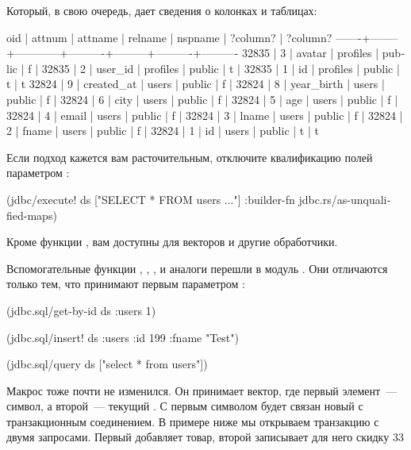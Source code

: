 Который, в свою очередь, дает сведения о колонках и таблицах:

\begin{english}
  \begin{text}
  oid  | attnum |  attname   | relname  | nspname | ?column? | ?column?
-------+--------+------------+----------+---------+----------+----------
 32835 |      3 | avatar     | profiles | public  | f        |
 32835 |      2 | user_id    | profiles | public  | t        |
 32835 |      1 | id         | profiles | public  | t        | t
 32824 |      9 | created_at | users    | public  | f        |
 32824 |      8 | year_birth | users    | public  | f        |
 32824 |      6 | city       | users    | public  | f        |
 32824 |      5 | age        | users    | public  | f        |
 32824 |      4 | email      | users    | public  | f        |
 32824 |      3 | lname      | users    | public  | f        |
 32824 |      2 | fname      | users    | public  | f        |
 32824 |      1 | id         | users    | public  | t        | t
  \end{text}
\end{english}

Если подход кажется вам расточительным, отключите квалификацию полей параметром :

\begin{english}
  \begin{clojure}
(jdbc/execute!
 ds
 ["SELECT * FROM users ..."]
 {:builder-fn jdbc.rs/as-unqualified-maps})
  \end{clojure}
\end{english}

Кроме функции , вам доступны  для векторов и другие обработчики.

Вспомогательные функции , , ,  и аналоги перешли в модуль . Они отличаются только тем, что принимают первым параметром :

\begin{english}
  \begin{clojure}
(jdbc.sql/get-by-id ds :users 1)

(jdbc.sql/insert! ds :users {:id 199 :fname "Test"})

(jdbc.sql/query ds ["select * from users"])
  \end{clojure}
\end{english}

Макрос  тоже почти не изменился. Он принимает вектор, где первый элемент~--- символ, а второй~--- текущий . С первым символом будет связан новый  с транзакционным соединением. В примере ниже мы открываем транзакцию с двумя запросами. Первый добавляет товар, второй записывает для него скидку 33%

